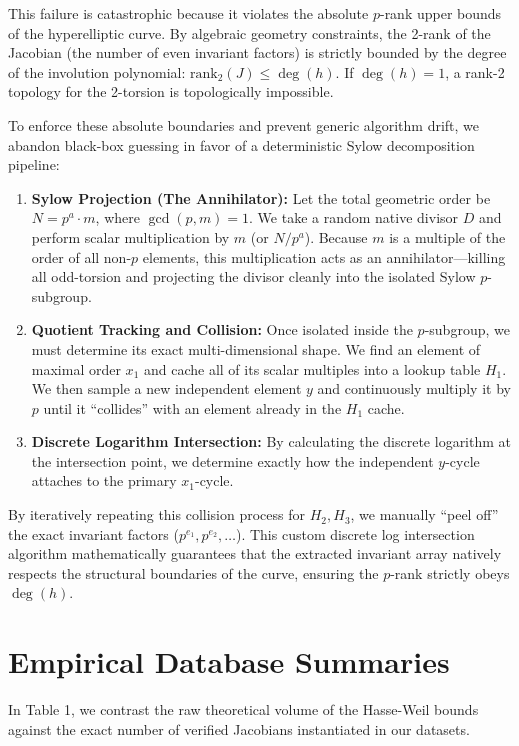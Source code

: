 \documentclass[letterpaper, 11pt]{article}
\begin{document}
This failure is catastrophic because it violates the absolute $p$-rank upper bounds of the hyperelliptic curve. By algebraic geometry constraints, the 2-rank of the Jacobian (the number of even invariant factors) is strictly bounded by the degree of the involution polynomial: $\text{rank}_2(J) \le \deg(h)$. If $\deg(h) = 1$, a rank-2 topology for the 2-torsion is topologically impossible.

To enforce these absolute boundaries and prevent generic algorithm drift, we abandon black-box guessing in favor of a deterministic Sylow decomposition pipeline:

\begin{enumerate}
    \item \textbf{Sylow Projection (The Annihilator):} Let the total geometric order be $N = p^a \cdot m$, where $\gcd(p,m)=1$. We take a random native divisor $D$ and perform scalar multiplication by $m$ (or $N/p^a$). Because $m$ is a multiple of the order of all non-$p$ elements, this multiplication acts as an annihilator—killing all odd-torsion and projecting the divisor cleanly into the isolated Sylow $p$-subgroup.
    \item \textbf{Quotient Tracking and Collision:} Once isolated inside the $p$-subgroup, we must determine its exact multi-dimensional shape. We find an element of maximal order $x_1$ and cache all of its scalar multiples into a lookup table $H_1$. We then sample a new independent element $y$ and continuously multiply it by $p$ until it ``collides'' with an element already in the $H_1$ cache. 
    \item \textbf{Discrete Logarithm Intersection:} By calculating the discrete logarithm at the intersection point, we determine exactly how the independent $y$-cycle attaches to the primary $x_1$-cycle.
\end{enumerate}

By iteratively repeating this collision process for $H_2, H_3$, we manually ``peel off'' the exact invariant factors ($p^{e_1}, p^{e_2}, \dots$). This custom discrete log intersection algorithm mathematically guarantees that the extracted invariant array natively respects the structural boundaries of the curve, ensuring the $p$-rank strictly obeys $\deg(h)$.

\section{Empirical Database Summaries}
In Table 1, we contrast the raw theoretical volume of the Hasse-Weil bounds against the exact number of verified Jacobians instantiated in our datasets.
\end{document}
